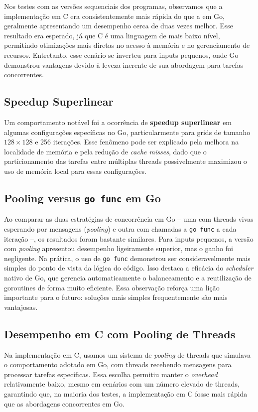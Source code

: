 \documentclass[14]{article}
\begin{document}
Nos testes com as versões sequenciais dos programas, observamos que a implementação em C era consistentemente mais rápida do que a em Go, geralmente apresentando um desempenho cerca de duas vezes melhor. Esse resultado era esperado, já que C é uma linguagem de mais baixo nível, permitindo otimizações mais diretas no acesso à memória e no gerenciamento de recursos. Entretanto, esse cenário se inverteu para inputs pequenos, onde Go demonstrou vantagens devido à leveza inerente de sua abordagem para tarefas concorrentes.

\subsection{Speedup Superlinear}

Um comportamento notável foi a ocorrência de \textbf{speedup superlinear} em algumas configurações específicas no Go, particularmente para grids de tamanho \(128 \times 128\) e 256 iterações. Esse fenômeno pode ser explicado pela melhora na localidade de memória e pela redução de \textit{cache misses}, dado que o particionamento das tarefas entre múltiplas threads possivelmente maximizou o uso de memória local para essas configurações.

\subsection{Pooling versus \texttt{go func} em Go}

Ao comparar as duas estratégias de concorrência em Go – uma com threads vivas esperando por mensagens (\textit{pooling}) e outra com chamadas a \texttt{go func} a cada iteração –, os resultados foram bastante similares. Para inputs pequenos, a versão com \textit{pooling} apresentou desempenho ligeiramente superior, mas o ganho foi negligente. Na prática, o uso de \texttt{go func} demonstrou ser consideravelmente mais simples do ponto de vista da lógica do código. Isso destaca a eficácia do \textit{scheduler} nativo de Go, que gerencia automaticamente o balanceamento e a reutilização de goroutines de forma muito eficiente. Essa observação reforça uma lição importante para o futuro: soluções mais simples frequentemente são mais vantajosas.

\subsection{Desempenho em C com Pooling de Threads}

Na implementação em C, usamos um sistema de \textit{pooling} de threads que simulava o comportamento adotado em Go, com threads recebendo mensagens para processar tarefas específicas. Essa escolha permitiu manter o \textit{overhead} relativamente baixo, mesmo em cenários com um número elevado de threads, garantindo que, na maioria dos testes, a implementação em C fosse mais rápida que as abordagens concorrentes em Go.
\end{document}
